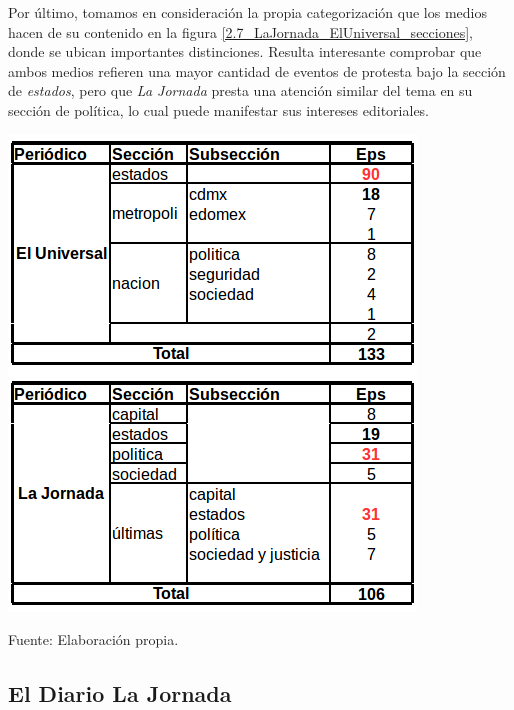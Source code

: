 \documentclass[letterpaper, 11pt]{book}
\theoremstyle{definition}
\theoremstyle{remark}
\begin{document}
Por último, tomamos en consideración la propia categorización que los medios hacen de su contenido en la figura \ref{2.7_LaJornada_ElUniversal_secciones}, donde se ubican importantes distinciones. 
Resulta interesante comprobar que ambos medios refieren una mayor cantidad de eventos de protesta bajo la sección de \emph{estados}, pero que \emph{La Jornada} presta una atención similar del tema en su sección de política, lo cual puede manifestar sus intereses editoriales.


\begin{minipage}{\linewidth}
\centering
{} \label{2.7_LaJornada_ElUniversal_secciones}
\includegraphics[scale=0.5]{img/2.7_LaJornada_ElUniversal_secciones.png}
\par\bigskip
\small Fuente: Elaboración propia.
\end{minipage}\bigskip





\subsection{El Diario La Jornada}
\label{sec:LaJornadaDiario}
\end{document}
